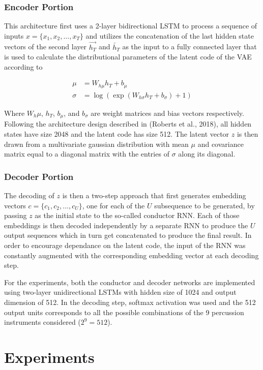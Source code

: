 \documentclass[10pt,twocolumn]{article}
\begin{document}
\subsubsection{Encoder Portion}
This architecture first uses a 2-layer bidirectional LSTM to process a sequence of inputs $x = \{ x_1, x_2, \hdots, x_T \}$ and utilizes the concatenation of the last hidden state vectors of the second layer $\overrightarrow{h_T}$ and $\overleftarrow{h_T}$ as the input to a fully connected layer that is used to calculate the distributional parameters of the latent code of the VAE according to 

\begin{align*}
  \mu &= W_{h\mu} h_T + b_\mu \\
  \sigma &= \log(\exp(W_{h\sigma} h_T + b_\sigma) + 1)
\end{align*}

Where $W_h\mu$, $h_T$, $b_\mu$, and $b_\sigma$ are weight matrices and bias vectors respectively. Following the architecture design described in (Roberts et al., 2018), all hidden states have size 2048 and the latent code has size 512. The latent vector $z$ is then drawn from a multivariate gaussian distribution with mean $\mu$ and covariance matrix equal to a diagonal matrix with the entries of $\sigma$ along its diagonal.

\subsubsection{Decoder Portion}
The decoding of $z$ is then a two-step approach that first generates embedding vectors $c = \{ c_1, c_2, ..., c_U \}$, one for each of the $U$ subsequence to be generated, by passing $z$ as the initial state to the so-called conductor RNN. Each of those embeddings is then decoded independently by a separate RNN to produce the $U$ output sequences which in turn get concatenated to produce the final result. In order to encourage dependance on the latent code, the input of the RNN was constantly augmented with the corresponding embedding vector at each decoding step.

For the experiments, both the conductor and decoder networks are implemented using two-layer unidirectional LSTMs with hidden size of 1024 and output dimension of 512. In the decoding step, softmax activation was used and the 512 output units corresponds to all the possible combinations of the 9 percussion instruments considered ($2^9 = 512$).

\section{Experiments}
\end{document}
